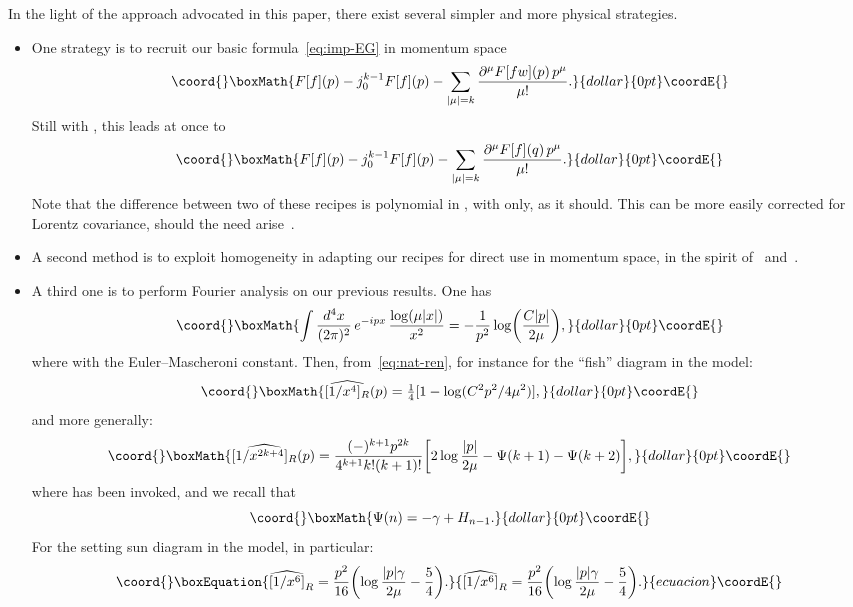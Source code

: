 \documentclass[a4paper,12pt]{article}
\providecommand{\del}{\partial}        %
\providecommand{\Ga}{\Gamma}           %
\providecommand{\ga}{\gamma}           %
\providecommand{\tquarter}{\tfrac{1}{4}} %
\providecommand{\7}{\dagger}           %
\theoremstyle{plain}
\theoremstyle{definition}
\begin{document}
In the light of the approach advocated in this paper, there exist
several simpler and more physical strategies.

\begin{itemize}
\item
One strategy is to recruit our basic formula~\eqref{eq:imp-EG} in
momentum space
$$\coord{}\boxMath{
F[f](p) - j^{k-1}_0 F[f](p) -
\sum_{|\mu|=k} \frac{\del^\mu F[fw](p)\,p^\mu}{\mu!}.
}{dollar}{0pt}\coordE{}$$
Still with \coordHE{}, this leads at once to
$$\coord{}\boxMath{
F[f](p) - j^{k-1}_0 F[f](p) -
\sum_{|\mu|=k} \frac{\del^\mu F[f](q)\,p^\mu}{\mu!}.
}{dollar}{0pt}\coordE{}$$
Note that the difference between two of these recipes is polynomial in
\coordHE{}, with \coordHE{} only, as it should. This can be more easily
corrected for Lorentz covariance, should the need
arise~\cite{Bettina}.

\item
A second method is to exploit homogeneity in adapting our recipes for
direct use in momentum space, in the spirit of~\cite{chavaloraro}
and~\cite{SmirIBP}.

\item
A third one is to perform Fourier analysis on our previous results.
One has
$$\coord{}\boxMath{
\int \frac{d^4x}{(2\pi)^2}\, e^{-ipx}\, \frac{\log(\mu|x|)}{x^2} =
- \frac{1}{p^2} \log\biggl(\frac{C|p|}{2\mu}\biggr),
}{dollar}{0pt}\coordE{}$$
where \myHighlight{$C := e^\ga \simeq 1.781072\dots$}\coordHE{} with \myHighlight{$\ga$}\coordHE{} the
Euler--Mascheroni constant. Then, from~\eqref{eq:nat-ren}, for
instance for the ``fish'' diagram in the \coordHE{} model:
$$\coord{}\boxMath{
\widehat{[1/x^4]_R}(p) = \tquarter[1 - \log(C^2p^2/4\mu^2)],
}{dollar}{0pt}\coordE{}$$
and more generally:
$$\coord{}\boxMath{
\widehat{[1/x^{2k+4}]_R}(p) = \frac{(-)^{k+1}p^{2k}}{4^{k+1}k!(k+1)!}
\biggl[2\log\frac{|p|}{2\mu} - \Psi(k+1) - \Psi(k+2)\biggr],
}{dollar}{0pt}\coordE{}$$
where \myHighlight{$\Psi(x) := d/dx(\log\Ga(x))$}\coordHE{} has been invoked, and we recall
that
$$\coord{}\boxMath{
\Psi(n) = -\ga + H_{n-1}.
}{dollar}{0pt}\coordE{}$$
For the setting sun diagram in the \coordHE{} model, in particular:
\begin{equation}\coord{}\boxEquation{
\widehat{[1/x^6]}_R =
\frac{p^2}{16} \biggl(\log\frac{|p|\ga}{2\mu} - \frac{5}{4}\biggr).
\label{eq:third-Fourier}
}{
\widehat{[1/x^6]}_R =
\frac{p^2}{16} \biggl(\log\frac{|p|\ga}{2\mu} - \frac{5}{4}\biggr).
}{ecuacion}\coordE{}\end{equation}
\end{itemize}
\end{document}
